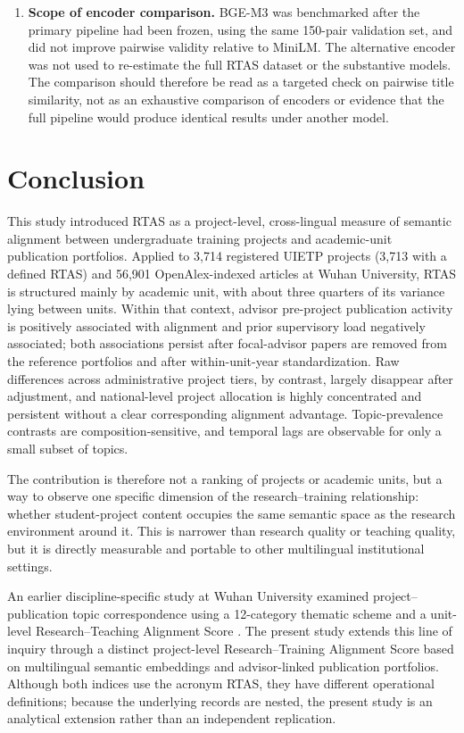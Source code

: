\documentclass[pdflatex,sn-apa]{sn-jnl}
\begin{document}
\begin{enumerate}
\item \textbf{Scope of encoder comparison.} BGE-M3 was benchmarked after the primary pipeline had been frozen, using the same 150-pair validation set, and did not improve pairwise validity relative to MiniLM. The alternative encoder was not used to re-estimate the full RTAS dataset or the substantive models. The comparison should therefore be read as a targeted check on pairwise title similarity, not as an exhaustive comparison of encoders or evidence that the full pipeline would produce identical results under another model.
\end{enumerate}

\section{Conclusion}

This study introduced RTAS as a project-level, cross-lingual measure of semantic alignment between undergraduate training projects and academic-unit publication portfolios. Applied to 3,714 registered UIETP projects (3,713 with a defined RTAS) and 56,901 OpenAlex-indexed articles at Wuhan University, RTAS is structured mainly by academic unit, with about three quarters of its variance lying between units. Within that context, advisor pre-project publication activity is positively associated with alignment and prior supervisory load negatively associated; both associations persist after focal-advisor papers are removed from the reference portfolios and after within-unit-year standardization. Raw differences across administrative project tiers, by contrast, largely disappear after adjustment, and national-level project allocation is highly concentrated and persistent without a clear corresponding alignment advantage. Topic-prevalence contrasts are composition-sensitive, and temporal lags are observable for only a small subset of topics.

The contribution is therefore not a ranking of projects or academic units, but a way to observe one specific dimension of the research--training relationship: whether student-project content occupies the same semantic space as the research environment around it. This is narrower than research quality or teaching quality, but it is directly measurable and portable to other multilingual institutional settings.

An earlier discipline-specific study at Wuhan University examined project--publication topic correspondence using a 12-category thematic scheme and a unit-level Research--Teaching Alignment Score \citep{tian2026surveying}. The present study extends this line of inquiry through a distinct project-level Research--Training Alignment Score based on multilingual semantic embeddings and advisor-linked publication portfolios. Although both indices use the acronym RTAS, they have different operational definitions; because the underlying records are nested, the present study is an analytical extension rather than an independent replication.
\end{document}
